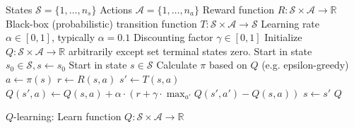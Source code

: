\documentclass{article}
\begin{document}
\begin{preview}
	\begin{algorithm}[H]
		\begin{algorithmic}
			\Require
			\Statex States $\mathcal{S} = \{1, \dots, n_s\}$
			\Statex Actions $\mathcal{A} = \{1, \dots, n_a\}$
			\Statex Reward function $R: \mathcal{S} \times \mathcal{A} \rightarrow \mathbb{R}$
			\Statex Black-box (probabilistic) transition function $T: \mathcal{S} \times \mathcal{A} \rightarrow \mathcal{S}$
			\Statex Learning rate $\alpha \in [0, 1]$, typically $\alpha = 0.1$
			\Statex Discounting factor $\gamma \in [0, 1]$
			\State Initialize $Q: \mathcal{S} \times \mathcal{A} \rightarrow \mathbb{R}$ arbitrarily except set terminal states zero.
			\State Start in state $s_0 \in \mathcal{S}, s \gets s_0$
			\State Start in state $s \in \mathcal{S}$
			\State Calculate $\pi$ based on $Q$ (e.g. epsilon-greedy)
			\State $a \gets \pi(s)$
			\State $r \gets R(s, a)$ 
			\State $s' \gets T(s, a)$ 
			\State $Q(s', a) \gets Q(s, a) + \alpha \cdot (r + \gamma \cdot \max_{a'} Q(s', a')-Q(s, a))$
			\State $s \gets s'$
			\EndWhile
			\EndWhile
			\Return $Q$
			\EndProcedure
		\end{algorithmic}
		\caption{$Q$-learning: Learn function $Q: \mathcal{S} \times \mathcal{A} \rightarrow \mathbb{R}$}
		\label{alg:q-learning}
	\end{algorithm}
\end{preview}
\end{document}
